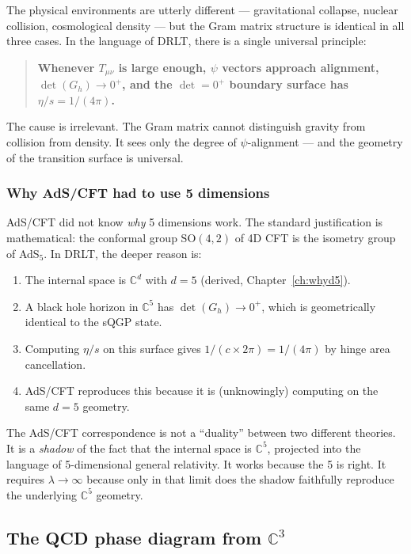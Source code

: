 The physical environments are utterly different --- gravitational collapse, nuclear collision, cosmological density --- but the Gram matrix structure is identical in all three cases. In the language of DRLT, there is a single universal principle:

\begin{quote}
\textbf{Whenever $T_{\mu\nu}$ is large enough, $\psi$ vectors approach alignment, $\det(G_h) \to 0^+$, and the $\det = 0^+$ boundary surface has $\eta/s = 1/(4\pi)$.}
\end{quote}

The cause is irrelevant. The Gram matrix cannot distinguish gravity from collision from density. It sees only the degree of $\psi$-alignment --- and the geometry of the transition surface is universal.

\subsubsection{Why AdS/CFT had to use 5 dimensions}

AdS/CFT did not know \emph{why} 5 dimensions work. The standard justification is mathematical: the conformal group $\text{SO}(4,2)$ of 4D CFT is the isometry group of AdS$_5$. In DRLT, the deeper reason is:

\begin{enumerate}
\item The internal space is $\mathbb{C}^d$ with $d = 5$ (derived, Chapter~\ref{ch:whyd5}).
\item A black hole horizon in $\mathbb{C}^5$ has $\det(G_h) \to 0^+$, which is geometrically identical to the sQGP state.
\item Computing $\eta/s$ on this surface gives $1/(c \times 2\pi) = 1/(4\pi)$ by hinge area cancellation.
\item AdS/CFT reproduces this because it is (unknowingly) computing on the same $d = 5$ geometry.
\end{enumerate}

The AdS/CFT correspondence is not a ``duality'' between two different theories. It is a \emph{shadow} of the fact that the internal space is $\mathbb{C}^5$, projected into the language of 5-dimensional general relativity. It works because the 5 is right. It requires $\lambda \to \infty$ because only in that limit does the shadow faithfully reproduce the underlying $\mathbb{C}^5$ geometry.

\subsection{The QCD phase diagram from $\mathbb{C}^3$}

